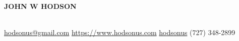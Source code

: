 \noindent\centerline{ \huge\textbf{JOHN W HODSON}}\\

\noindent
\faEnvelopeSquare \space\href{mailto:hodsonus@gmail.com}{hodsonus@gmail.com} \hspace*{\fill}
\faHome \space \href{https://www.hodsonus.com}{https://www.hodsonus.com} \hspace*{\fill}
\faGithub \space \href{https://github.com/hodsonus}{hodsonus} \hspace*{\fill}
\faMobilePhone \space (727) 348-2899\\